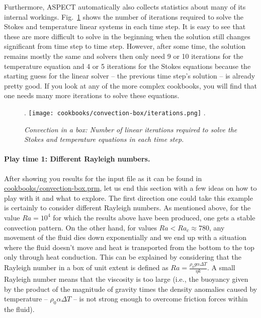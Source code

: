 \documentclass{article}
\newcommand{\aspect}{\textsc{ASPECT}}
\begin{document}
Furthermore, \aspect{} automatically also collects statistics about many of its
internal workings. Fig.~\ref{fig:convection-box-iterations} shows the number of
iterations required to solve the Stokes and temperature linear systems in each
time step. It is easy to see that these are more difficult to solve in the
beginning when the solution still changes significant from time step to time
step. However, after some time, the solution remains mostly the same and solvers
then only need 9 or 10 iterations for the temperature equation and 4 or 5
iterations for the Stokes equations because the starting guess for the linear
solver -- the previous time step's solution -- is already pretty good. If you
look at any of the more complex cookbooks, you will find that one needs many
more iterations to solve these equations.

\begin{figure}
\phantom.
\hfill
\texttt{[image: cookbooks/convection-box/iterations.png]}
\hfill
\phantom.
\caption{\it Convection in a box: Number of linear iterations required to solve
the Stokes and temperature equations in each time step.}
\label{fig:convection-box-iterations}
\end{figure}


\paragraph{Play time 1: Different Rayleigh numbers.} After showing you results
for the input file as it can be found in \url{cookbooks/convection-box.prm}, let us
end this section with a few ideas on how to play with it and what to explore.
The first direction one could take this example is certainly to consider
different Rayleigh numbers. As mentioned above, for the value $Ra=10^4$ for
which the results above have been produced, one gets a stable convection
pattern. On the other hand, for values $Ra<Ra_c\approx 780$, any movement of
the fluid dies down exponentially and we end up with a situation where the fluid
doesn't move and heat is transported from the bottom to the top only through
heat conduction. This can be explained by considering that the Rayleigh number
in a box of unit extent is defined as $Ra=\frac{\rho_0 g\alpha\Delta T}{\eta k}$. A small
Rayleigh number means that the viscosity is too large (i.e., the buoyancy given
by the product of the magnitude of gravity times the density anomalies caused by temperature
-- $\rho_0 \alpha \Delta T$ -- is not strong enough to overcome friction forces within the fluid).
\end{document}
